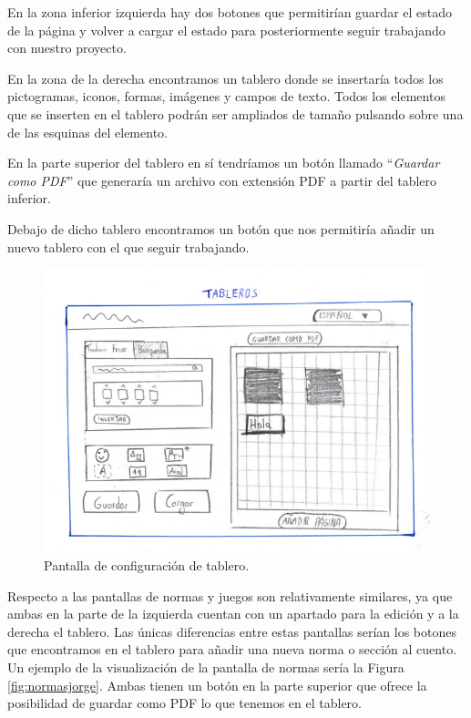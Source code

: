 	
	En la zona inferior izquierda hay dos botones que permitirían guardar el estado de la página y volver a cargar el estado para posteriormente seguir trabajando con nuestro proyecto.
	
	
	En la zona de la derecha encontramos un tablero donde se insertaría todos los pictogramas, iconos, formas, imágenes y campos de texto. Todos los elementos que se inserten en el tablero podrán ser ampliados de tamaño pulsando sobre una de las esquinas del elemento.
	
	En la parte superior del tablero en sí tendríamos un botón llamado “\textit{Guardar como PDF}” que generaría un archivo con extensión PDF a partir del tablero inferior.
	
	Debajo de dicho tablero encontramos un botón que nos permitiría añadir un nuevo tablero con el que seguir trabajando.
	
	
	
	\begin{figure}[h!]
		\centering
		\includegraphics[width=0.7\linewidth]{Imagenes/Bitmap/tablerosJorge}
		\caption{Pantalla de configuración de tablero.}
		\label{fig:tablerosjorge}
	\end{figure}
	
	
	

	Respecto a las pantallas de normas y juegos son relativamente similares, ya que ambas en la parte de la izquierda cuentan con un apartado para la edición y a la derecha el tablero. Las únicas diferencias entre estas pantallas serían los botones que encontramos en el tablero para añadir una nueva norma o sección al cuento. Un ejemplo de la visualización de la pantalla de normas sería la Figura \ref{fig:normasjorge}. Ambas tienen un botón en la parte superior que ofrece la posibilidad de guardar como PDF lo que tenemos en el tablero.
	
